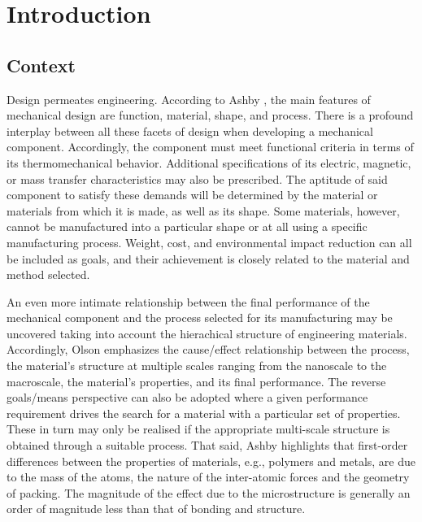 \chapter{Introduction}

\section{Context}

Design permeates engineering.
According to Ashby \citep{ashbyMaterialsSelectionMechanical1999}, the main features of mechanical design are function, material, shape, and process.
There is a profound interplay between all these facets of design when developing a mechanical component.
Accordingly, the component must meet functional criteria in terms of its thermomechanical behavior.
Additional specifications of its electric, magnetic, or mass transfer characteristics may also be prescribed.
The aptitude of said component to satisfy these demands will be determined by the material or materials from which it is made, as well as its shape.
Some materials, however, cannot be manufactured into a particular shape or at all using a specific manufacturing process.
Weight, cost, and environmental impact reduction can all be included as goals, and their achievement is closely related to the material and method selected.

An even more intimate relationship between the final performance of the mechanical component and the process selected for its manufacturing may be uncovered taking into account the hierachical structure of engineering materials.
Accordingly, Olson \citep{olsonDesigningNewMaterial2000} emphasizes the cause/effect relationship between the process, the material's structure at multiple scales ranging from the nanoscale to the macroscale, the material's properties, and its final performance.
The reverse goals/means perspective can also be adopted where a given performance requirement drives the search for a material with a particular set of properties.
These in turn may only be realised if the appropriate multi-scale structure is obtained through a suitable process.
That said, Ashby \citep{ashbyMaterialsSelectionMechanical1999} highlights that first-order differences between the properties of materials, e.g., polymers and metals, are due to the mass of the atoms, the nature of the inter-atomic forces and the geometry of packing.
The magnitude of the effect due to the microstructure is generally an order of magnitude less than that of bonding and structure.

